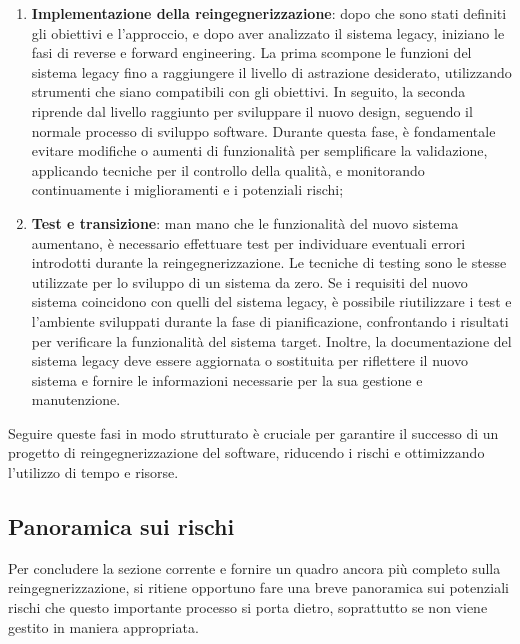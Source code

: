 \begin{enumerate}
  \item \textbf{Implementazione della reingegnerizzazione}: dopo che sono stati definiti gli obiettivi e l'approccio, e dopo aver analizzato il sistema legacy, iniziano le fasi di reverse e forward engineering. La prima scompone le funzioni del sistema legacy fino a raggiungere il livello di astrazione desiderato, utilizzando strumenti che siano compatibili con gli obiettivi. In seguito, la seconda riprende dal livello raggiunto per sviluppare il nuovo design, seguendo il normale processo di sviluppo software. Durante questa fase, è fondamentale evitare modifiche o aumenti di funzionalità per semplificare la validazione, applicando tecniche per il controllo della qualità, e monitorando continuamente i miglioramenti e i potenziali rischi;

  \item \textbf{Test e transizione}: man mano che le funzionalità del nuovo sistema aumentano, è necessario effettuare test per individuare eventuali errori introdotti durante la reingegnerizzazione. Le tecniche di testing sono le stesse utilizzate per lo sviluppo di un sistema da zero. Se i requisiti del nuovo sistema coincidono con quelli del sistema legacy, è possibile riutilizzare i test e l'ambiente sviluppati durante la fase di pianificazione, confrontando i risultati per verificare la funzionalità del sistema target. Inoltre, la documentazione del sistema legacy deve essere aggiornata o sostituita per riflettere il nuovo sistema e fornire le informazioni necessarie per la sua gestione e manutenzione.
\end{enumerate}

Seguire queste fasi in modo strutturato è cruciale per garantire il successo di un progetto di reingegnerizzazione del software, riducendo i rischi e ottimizzando l'utilizzo di tempo e risorse.

\subsection{Panoramica sui rischi}
Per concludere la sezione corrente e fornire un quadro ancora più completo sulla reingegnerizzazione, si ritiene opportuno fare una breve panoramica sui potenziali rischi che questo importante processo si porta dietro, soprattutto se non viene gestito in maniera appropriata.

